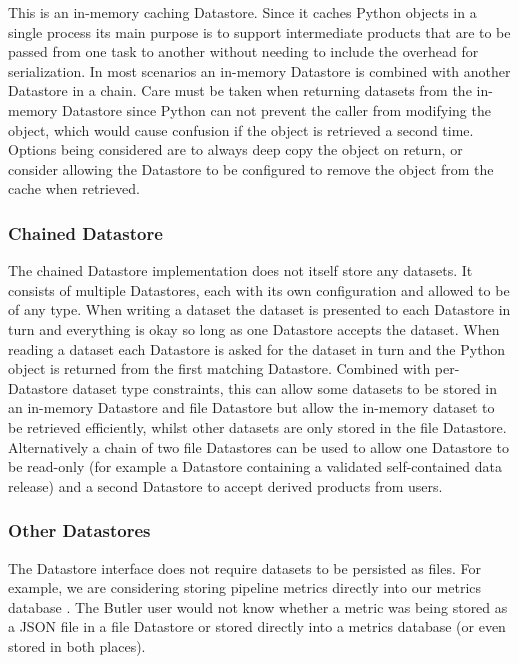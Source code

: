 \documentclass[]{spie}
\begin{document}
This is an in-memory caching Datastore.
Since it caches Python objects in a single process its main purpose is to support intermediate products that are to be passed from one task to another without needing to include the overhead for serialization.
In most scenarios an in-memory Datastore is combined with another Datastore in a chain.
Care must be taken when returning datasets from the in-memory Datastore since Python can not prevent the caller from modifying the object, which would cause confusion if the object is retrieved a second time.
Options being considered are to always deep copy the object on return, or consider allowing the Datastore to be configured to remove the object from the cache when retrieved.

\subsubsection{Chained Datastore}

The chained Datastore implementation does not itself store any datasets.
It consists of multiple Datastores, each with its own configuration and allowed to be of any type.
When writing a dataset the dataset is presented to each Datastore in turn and everything is okay so long as one Datastore accepts the dataset.
When reading a dataset each Datastore is asked for the dataset in turn and the Python object is returned from the first matching Datastore.
Combined with per-Datastore dataset type constraints, this can allow some datasets to be stored in an in-memory Datastore and file Datastore but allow the in-memory dataset to be retrieved efficiently, whilst other datasets are only stored in the file Datastore.
Alternatively a chain of two file Datastores can be used to allow one Datastore to be read-only (for example a Datastore containing a validated self-contained data release) and a second Datastore to accept derived products from users.

\subsubsection{Other Datastores}

The Datastore interface does not require datasets to be persisted as files.
For example, we are considering storing pipeline metrics directly into our metrics database \cite{SQR-019,DMTN-203}.
The Butler user would not know whether a metric was being stored as a JSON file in a file Datastore or stored directly into a metrics database (or even stored in both places).
\end{document}
